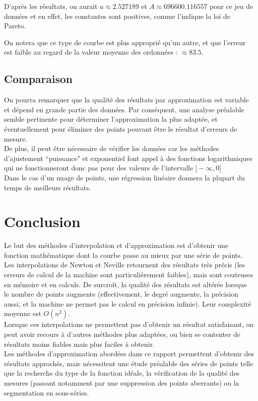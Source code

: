 \documentclass{report}
\begin{document}
        D'après les résultats, on aurait $a\approx2.527189$ et $A\approx696600.116557$ pour ce jeu de données et en effet, les constantes sont positives, comme l'indique la loi de Pareto.
        
        On notera que ce type de courbe est plus approprié qu'un autre, et que l'erreur est faible au regard de la valeur moyenne des ordonnées : $\approx 83.5$.
    \section{Comparaison}
      On pourra remarquer que la qualité des résultats par approximation est variable et dépend en grande partie des données. Par conséquent, une analyse préalable semble pertinente pour déterminer l'approximation la plus adaptée, et éventuellement pour éliminer des points pouvant être le résultat d'erreurs de mesure.\\ De plus, il peut être nécessaire de vérifier les données car les méthodes d'ajustement ``puissance" et exponentiel font appel à des fonctions logarithmiques qui ne fonctionneront donc pas pour des valeurs de l'intervalle $]-\infty, 0]$\\
      Dans le cas d'un nuage de points, une régression linéaire donnera la plupart du temps de meilleurs résultats.
  \chapter{Conclusion}
    Le but des méthodes d'interpolation et d'approximation est d'obtenir une fonction mathématique dont la courbe passe au mieux par une série de points.\\
    
    Les interpolations de Newton et Neville retournent des résultats très précis (les erreurs de calcul de la machine sont particulièrement faibles), mais sont couteuses en mémoire et en calculs. De surcroît, la qualité des résultats est altérée lorsque le nombre de points augmente (effectivement, le degré augmente, la précision aussi, et la machine ne permet pas le calcul en précision infinie). Leur complexité moyenne est $O(n^2)$.\\
    
    Lorsque ces interpolations ne permettent pas d'obtenir un résultat satisfaisant, on peut avoir recours à d'autres méthodes plus adaptées, ou bien se contenter de résultats moins fiables mais plus faciles à obtenir.\\
    
    Les méthodes d'approximation abordées dans ce rapport permettent d'obtenir des résultats approchés, mais nécessitent une étude préalable des séries de points telle que la recherche du type de la fonction idéale, la vérification de la qualité des mesures (passant notamment par une suppression des points aberrants) ou la segmentation en sous-séries.\\
    
\end{document}
